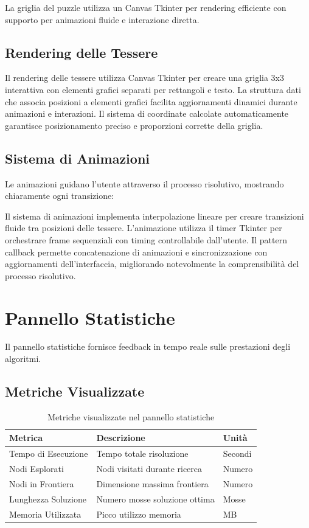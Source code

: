 \documentclass[12pt,a4paper]{report}
\theoremstyle{definition}
\begin{document}
La griglia del puzzle utilizza un Canvas Tkinter per rendering efficiente con supporto per animazioni fluide e interazione diretta.

\subsection{Rendering delle Tessere}

Il rendering delle tessere utilizza Canvas Tkinter per creare una griglia 3x3 interattiva con elementi grafici separati per rettangoli e testo. La struttura dati che associa posizioni a elementi grafici facilita aggiornamenti dinamici durante animazioni e interazioni. Il sistema di coordinate calcolate automaticamente garantisce posizionamento preciso e proporzioni corrette della griglia.

\subsection{Sistema di Animazioni}

Le animazioni guidano l'utente attraverso il processo risolutivo, mostrando chiaramente ogni transizione:

Il sistema di animazioni implementa interpolazione lineare per creare transizioni fluide tra posizioni delle tessere. L'animazione utilizza il timer Tkinter per orchestrare frame sequenziali con timing controllabile dall'utente. Il pattern callback permette concatenazione di animazioni e sincronizzazione con aggiornamenti dell'interfaccia, migliorando notevolmente la comprensibilità del processo risolutivo.

\section{Pannello Statistiche}

Il pannello statistiche fornisce feedback in tempo reale sulle prestazioni degli algoritmi.

\subsection{Metriche Visualizzate}

\begin{table}[H]
\centering
\caption{Metriche visualizzate nel pannello statistiche}
\begin{tabular}{|l|l|l|}
\hline
\textbf{Metrica} & \textbf{Descrizione} & \textbf{Unità} \\
\hline
Tempo di Esecuzione & Tempo totale risoluzione & Secondi \\
Nodi Esplorati & Nodi visitati durante ricerca & Numero \\
Nodi in Frontiera & Dimensione massima frontiera & Numero \\
Lunghezza Soluzione & Numero mosse soluzione ottima & Mosse \\
Memoria Utilizzata & Picco utilizzo memoria & MB \\
\hline
\end{tabular}
\end{table}
\end{document}
